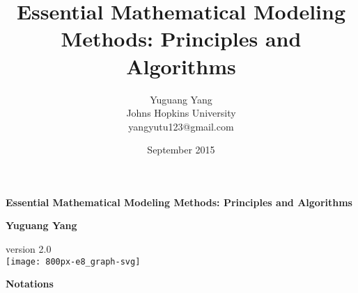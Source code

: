 \documentclass[oneside,hidelinks,12pt,letterpaper]{scrbook} %
\title{\huge \textbf{Essential Mathematical Modeling Methods: Principles and Algorithms}}
\author{Yuguang Yang \\
Johns Hopkins University \\yangyutu123@gmail.com }
\date{September 2015}
\theoremstyle{remark}
\theoremstyle{coloredRemark}
\theoremstyle{coloredNote}
\begin{document}
\sloppy


\begin{titlepage}
    \begin{center}
        \vspace*{1cm}
        
        {\huge \textbf{Essential Mathematical Modeling Methods: Principles and Algorithms}}
        
        
        \vspace{1.8cm}
       {\Large\textbf{Yuguang Yang}}\\
       \vspace{0.5cm}
       
       version 2.0 \\
\vspace{2.8cm}
        	\texttt{[image: 800px-e8\_graph-svg]}
        
         
    
        
    \end{center}





\end{titlepage}



\newpage

\begin{center}
	\Large
	\textbf{\huge Notations}
	
	\vspace{0.4cm}
	\large
	
	\vspace{0.4cm}
\end{center}
\end{document}
